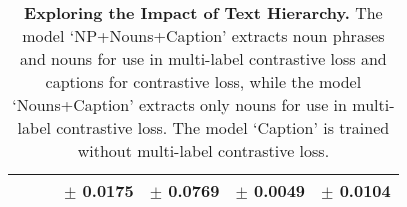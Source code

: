 \begin{table}[htbp]
\begin{tabular}{c|c|c|c|c|c|c}
    & & & $\pm$ 0.0175 & $\pm$ 0.0769 & $\pm$ 0.0049 & $\pm$ 0.0104\\
    
    \bottomrule
  \end{tabular}
  \caption[\textbf{Exploring the Impact of Text Hierarchy}]{\textbf{Exploring the Impact of Text Hierarchy.} The model `NP+Nouns+Caption' extracts noun phrases and nouns for use in multi-label contrastive loss and captions for contrastive loss, while the model `Nouns+Caption' extracts only nouns for use in multi-label contrastive loss. The model `Caption' is trained without multi-label contrastive loss.}
  \label{tab:texthierarchy}
\end{table}





    
